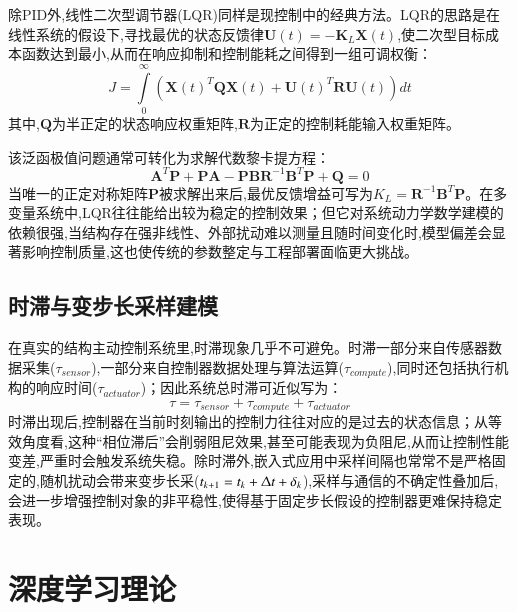 \documentclass{scrbook}
\begin{document}
{除PID外,线性二次型调节器(LQR)同样是现控制中的经典方法。LQR的思路是在线性系统的假设下,寻找最优的状态反馈律$\mathbf{U}(t)=-\mathbf{K}_{L}\mathbf{X}(t)$,使二次型目标成本函数达到最小,从而在响应抑制和控制能耗之间得到一组可调权衡：
\begin{equation}
\tag{2-10}
J=\int \limits_{0}^{\infty }\left(\mathbf{X}(t)^{T}\mathbf{QX}(t)+\mathbf{U}(t)^{T}\mathbf{RU}(t)\right)dt
\end{equation}
其中,$\mathbf{Q}$为半正定的状态响应权重矩阵,$\mathbf{R}$为正定的控制耗能输入权重矩阵。

该泛函极值问题通常可转化为求解代数黎卡提方程：
\begin{equation}
\tag{2-11}
\mathbf{A}^{T}\mathbf{P}+\mathbf{PA}-\mathbf{PB}\mathbf{R}^{-1}\mathbf{B}^{T}\mathbf{P}+\mathbf{Q}=0
\end{equation}
当唯一的正定对称矩阵$\mathbf{P}$被求解出来后,最优反馈增益可写为$K_{L}=\mathbf{R}^{-1}\mathbf{B}^{T}\mathbf{P}$。在多变量系统中,LQR往往能给出较为稳定的控制效果；但它对系统动力学数学建模的依赖很强,当结构存在强非线性、外部扰动难以测量且随时间变化时,模型偏差会显著影响控制质量,这也使传统的参数整定与工程部署面临更大挑战。

\subsection{\label{ref-021}时滞与变步长采样建模\label{mark-2.1.3}}

在真实的结构主动控制系统里,时滞现象几乎不可避免。时滞一部分来自传感器数据采集($\tau _{\textit{sensor}}$),一部分来自控制器数据处理与算法运算($\tau _{\textit{compute}}$),同时还包括执行机构的响应时间($\tau _{\textit{actuator}}$)；因此系统总时滞可近似写为：
\begin{equation}
\tag{2-12}
\tau =\tau _{\textit{sensor}}+\tau _{\textit{compute}}+\tau _{\textit{actuator}}
\end{equation}
时滞出现后,控制器在当前时刻输出的控制力往往对应的是过去的状态信息；从等效角度看,这种``相位滞后''会削弱阻尼效果,甚至可能表现为负阻尼,从而让控制性能变差,严重时会触发系统失稳。除时滞外,嵌入式应用中采样间隔也常常不是严格固定的,随机扰动会带来变步长采($t_{k+1}=t_{k}+\Updelta t+\delta _{k}$),采样与通信的不确定性叠加后,会进一步增强控制对象的非平稳性,使得基于固定步长假设的控制器更难保持稳定表现。

\section{\label{ref-022}深度学习理论\label{mark-2.2}}

}
\end{document}
